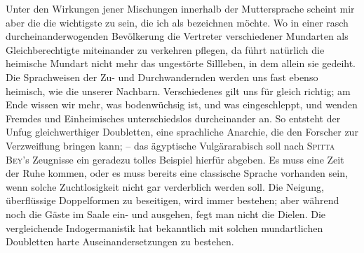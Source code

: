{\largerpage[1]Unter den Wirkungen jener Mischungen innerhalb der Muttersprache scheint mir aber die die wichtigste zu sein, die ich als  bezeichnen möchte.  Wo  in einer rasch durcheinanderwogenden Bevölkerung die Vertreter verschiedener Mundarten als Gleichberechtigte miteinander zu verkehren pflegen, da führt natürlich die heimische Mundart nicht mehr das ungestörte Sillleben, \label{fp.270} in dem allein sie gedeiht. Die Sprachweisen der Zu- und Durchwandernden werden uns fast ebenso heimisch, wie die unserer Nachbarn. Verschiedenes gilt uns für gleich richtig;  am Ende wissen wir  mehr, was bodenwüchsig ist, und was eingeschleppt, und wenden Fremdes und Einheimisches unterschiedslos durcheinander an. So entsteht der Unfug gleichwerthiger Doubletten, eine sprachliche Anarchie, die den Forscher zur Verzweiflung bringen kann; – das ägyptische Vulgärarabisch soll nach \textsc{Spitta Bey}’s Zeugnisse ein geradezu tolles Beispiel hierfür abgeben. Es muss eine Zeit der Ruhe kommen, oder es muss bereits eine classische Sprache vorhanden sein, wenn solche Zuchtlosigkeit nicht gar verderblich werden soll. Die Neigung, überflüssige Doppelformen zu beseitigen, wird immer bestehen; aber während noch die Gäste im Saale ein- und ausgehen, fegt man nicht die Dielen.  Die vergleichende Indogermanistik hat bekanntlich mit solchen mundartlichen Doubletten harte Auseinandersetzungen zu bestehen.

}
